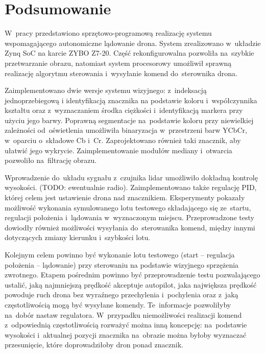 \chapter{Podsumowanie}
\label{cha:Podsumowanie i kierunki dalszych prac}

W~pracy przedstawiono sprzętowo-programową realizację systemu wspomagającego autonomiczne lądowanie drona.
System zrealizowano w~układzie Zynq SoC na karcie ZYBO Z7-20. 
Część rekonfigurowalna pozwoliła na~szybkie przetwarzanie obrazu, natomiast system procesorowy umożliwił sprawną realizację algorytmu sterowania i~wysyłanie komend do~sterownika drona. 

Zaimplementowano dwie wersje systemu wizyjnego: z~indeksacją jednoprzebiegową i identyfikacją znacznika na podstawie koloru i~współczynnika kształtu oraz z~wyznaczaniem środka ciężkości i~identyfikacją markera przy użyciu jego barwy. 
Poprawną segmentacje na~podstawie koloru przy niewielkiej zależności od~oświetlenia umożliwiła binaryzacja w~przestrzeni barw YCbCr, w~oparciu o~składowe Cb i~Cr. 
Zaprojektowano również taki znacznik, aby ułatwić jego wykrycie. 
Zaimplementowanie modułów mediany i~otwarcia pozwoliło na~filtrację obrazu.

Wprowadzenie do~układu sygnału z~czujnika lidar umożliwiło dokładną kontrolę wysokości. (TODO: ewentualnie radio).
Zaimplementowano także regulację PID, której celem jest ustawienie drona nad znacznikiem. 
Eksperymenty pokazały możliwość wykonania symulowanego lotu testowego składającego się ze~startu, regulacji położenia i~lądowania w~wyznaczonym miejscu.
Przeprowadzone testy dowiodły również możliwości wysyłania do~sterowanika komend, między innymi dotyczących zmiany kierunku i~szybkości lotu. 

Kolejnym celem powinno być wykonanie lotu testowego (start -- regulacja położenia -- lądowanie) przy sterowaniu na podstawie wizyjnego sprzężenia zwrotnego. 
Etapem pośrednim powinno być przeprowadzenie testu pozwalającego ustalić, jaką najmniejszą prędkość akceptuje autopilot, jaka największa prędkość powoduje ruch drona bez wyraźnego przechylenia i~pochylenia oraz z~jaką częstotliwością mogą być wysyłane komendy. 
Te~informacje pozwoliłyby na~dobór nastaw regulatora. 
W~przypadku niemożliwości realizacji komend z~odpowiednią częstotliwością rozważyć można inną koncepcję: na~podstawie wysokości i~aktualnej pozycji znacznika na~obrazie można byłoby wyznaczać przesunięcie, które doprowadziłoby dron ponad znacznik. %

